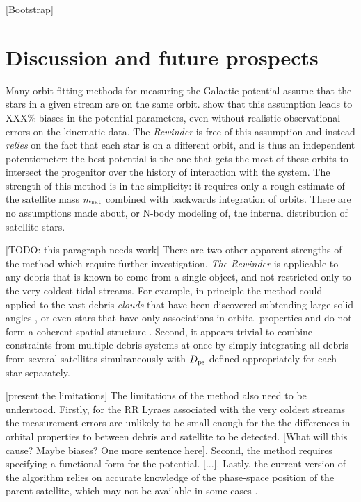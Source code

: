 \documentclass[preprint]{aastex}
\begin{document}
[Bootstrap]


\section{Discussion and future prospects}

Many orbit fitting methods for measuring the Galactic potential assume that the stars in a given stream are on the same
orbit. \cite{binney08} show that this assumption leads to XXX\% biases in the 
potential parameters, even without realistic observational errors on
the kinematic data. The \emph{Rewinder} is
free of this assumption and instead \emph{relies} on the fact that
each star is on a different orbit, and is thus an independent potentiometer: the best potential is the one that gets the
most of these orbits to intersect the progenitor
over the history of interaction with the system. The strength of this method is in the simplicity: it requires only a rough estimate of the satellite mass $m_{\rm sat}$ combined with backwards integration of orbits. There are no assumptions made about, or N-body modeling of, the internal distribution of satellite stars.

[TODO: this paragraph needs work]
There are two other apparent strengths of the method which require further investigation.
\emph{The Rewinder} is applicable to any debris that is known to come from a single object, and not restricted only to the very coldest tidal streams. For example, in principle the
method could applied to the vast debris {\it clouds} that have been discovered subtending large solid angles \citep[e.g. the Triangulum Andromeda
and Hercules-Aquila clouds]{rochapinto04,belokurov06}, or even stars that have only associations in orbital properties and do not form a coherent spatial structure
\citep[such as the angular momentum groupings in local giants found by][]{helmi99}. Second, it appears trivial to combine constraints from multiple debris systems at once by simply integrating all debris from several satellites simultaneously with $D_{\rm ps}$ defined appropriately for each star separately.

[present the limitations]
The limitations of the method also need to be understood. Firstly, for the RR Lyraes associated with the very coldest streams \citep[e.g. the globular clusters Pal5
and GD1][]{odenkirchen02,koposov10} the measurement errors are unlikely to be small enough for the
the differences in orbital properties to between debris and satellite to be detected. [What will this cause? Maybe biases? One more sentence here]. Second, the method requires specifying a functional form for the potential. [...]. Lastly, the current version of the algorithm relies on accurate knowledge of the phase-space position of the parent satellite, which may not be available in some cases \citep[for example, for the Orphan Stream][]{belokurov07}. 
\end{document}
